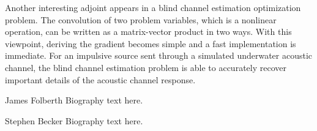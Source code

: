 \documentclass[journal]{IEEEtran}
\begin{document}
Another interesting adjoint appears in a blind channel estimation optimization problem.  The convolution of two problem variables, which is a nonlinear operation, can be written as a matrix-vector product in two ways.  With this viewpoint, deriving the gradient becomes simple and a fast implementation is immediate.  For an impulsive source sent through a simulated underwater acoustic channel, the blind channel estimation problem is able to accurately recover important details of the acoustic channel response.





\begin{IEEEbiographynophoto}{James Folberth}
Biography text here.
\end{IEEEbiographynophoto}

\begin{IEEEbiographynophoto}{Stephen Becker}
Biography text here.
\end{IEEEbiographynophoto}
\end{document}
